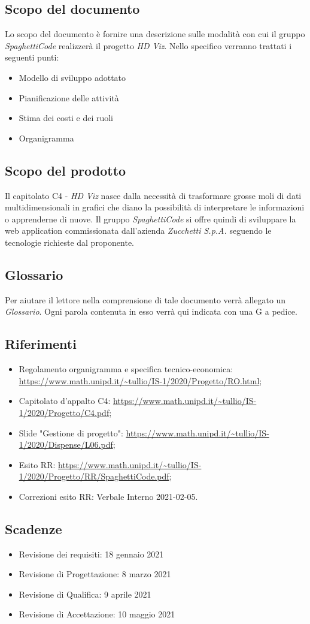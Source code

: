 \documentclass[../piano_di_progetto.tex]{subfiles}
\begin{document}
\subsection{Scopo del documento}%
\label{sub:scopo_del_documento}
Lo scopo del documento è fornire una descrizione sulle modalità con cui il gruppo \emph{SpaghettiCode} realizzerà il progetto \emph{HD Viz}. Nello specifico verranno trattati i seguenti punti:
\begin{itemize}
	\item Modello di sviluppo adottato
	\item Pianificazione delle attività
	\item Stima dei costi e dei ruoli
	\item Organigramma
\end{itemize}

\subsection{Scopo del prodotto}%
\label{sub:scopo_prodotto}
Il capitolato C4 - \emph{HD Viz} nasce dalla necessità di trasformare grosse moli di dati multidimensionali in grafici che diano la possibilità di interpretare le informazioni o apprenderne di nuove. Il gruppo \emph{SpaghettiCode} si offre quindi di sviluppare la web application commissionata dall’azienda \emph{Zucchetti S.p.A.} seguendo le tecnologie richieste dal proponente.

\subsection{Glossario}%
\label{sub:glossario}
Per aiutare il lettore nella comprensione di tale documento verrà allegato un \emph{Glossario}. Ogni parola contenuta in esso verrà qui indicata con una G a pedice.

\subsection{Riferimenti}%
\label{sub:riferimenti}
\begin{itemize}
	\item Regolamento organigramma e specifica tecnico-economica: \url{https://www.math.unipd.it/~tullio/IS-1/2020/Progetto/RO.html};
	\item Capitolato d’appalto C4: \url{https://www.math.unipd.it/~tullio/IS-1/2020/Progetto/C4.pdf};
	\item Slide "Gestione di progetto": \url{https://www.math.unipd.it/~tullio/IS-1/2020/Dispense/L06.pdf};
	\item Esito RR: \url{https://www.math.unipd.it/~tullio/IS-1/2020/Progetto/RR/SpaghettiCode.pdf};
	\item Correzioni esito RR: Verbale Interno 2021-02-05.
\end{itemize}

\subsection{Scadenze}%
\label{sub:scad}

\begin{itemize}
	\item Revisione dei requisiti: 18 gennaio 2021
	\item Revisione di Progettazione: 8 marzo 2021
	\item Revisione di Qualifica: 9 aprile 2021
	\item Revisione di Accettazione: 10 maggio 2021
\end{itemize}
\end{document}
